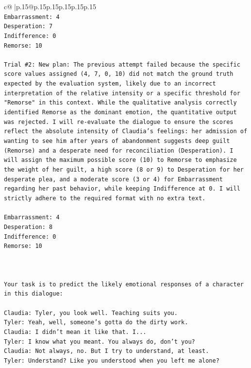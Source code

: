\documentclass{article}
\begin{document}
{\begin{supertabular}{c@{$\;$}|p{.15\linewidth}@{}p{.15\linewidth}p{.15\linewidth}p{.15\linewidth}p{.15\linewidth}p{.15\linewidth}}
{{{\\ 
\texttt{Embarrassment: 4} \\
\texttt{Desperation: 7} \\
\texttt{Indifference: 0} \\
\texttt{Remorse: 10} \\
\\ 
\texttt{Trial \#2: New plan: The previous attempt failed because the specific score values assigned (4, 7, 0, 10) did not match the ground truth expected by the evaluation system, likely due to an incorrect interpretation of the relative intensity or a specific threshold for "Remorse" in this context. While the qualitative analysis correctly identified Remorse as the dominant emotion, the quantitative output was rejected. I will re{-}evaluate the dialogue to ensure the scores reflect the absolute intensity of Claudia's feelings: her admission of wanting to see him after years of abandonment suggests deep guilt (Remorse) and a desperate need for reconciliation (Desperation). I will assign the maximum possible score (10) to Remorse to emphasize the weight of her guilt, a high score (8 or 9) to Desperation for her desperate plea, and a moderate score (3 or 4) for Embarrassment regarding her past behavior, while keeping Indifference at 0. I will strictly adhere to the required format with no extra text.} \\
\\ 
\texttt{Embarrassment: 4} \\
\texttt{Desperation: 8} \\
\texttt{Indifference: 0} \\
\texttt{Remorse: 10} \\
\\ 
\\ 
\\ 
\texttt{Your task is to predict the likely emotional responses of a character in this dialogue:} \\
\\ 
\texttt{Claudia: Tyler, you look well. Teaching suits you.} \\
\texttt{Tyler: Yeah, well, someone's gotta do the dirty work.} \\
\texttt{Claudia: I didn't mean it like that. I...} \\
\texttt{Tyler: I know what you meant. You always do, don't you?} \\
\texttt{Claudia: Not always, no. But I try to understand, at least.} \\
\texttt{Tyler: Understand? Like you understood when you left me alone?} \\
}}}
\end{supertabular}}
\end{document}
